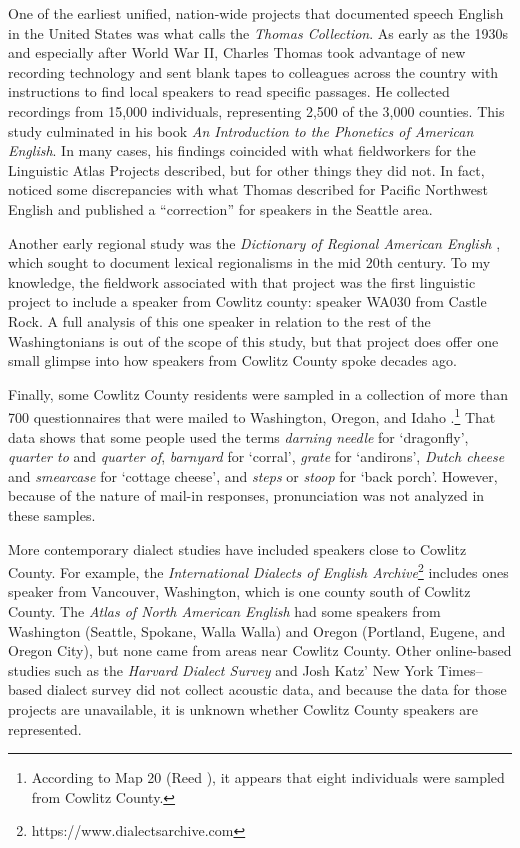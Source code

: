 One of the earliest unified, nation-wide projects that documented speech English in the United States was what \citet[216--217]{allen_1977} calls the \textit{Thomas Collection}. As early as the 1930s and especially after World War II, Charles Thomas took advantage of new recording technology and sent blank tapes to colleagues across the country with instructions to find local speakers to read specific passages. He collected recordings from 15,000 individuals, representing 2,500 of the 3,000 counties. This study culminated in his \citeyear{thomas_1958} book \textit{An Introduction to the Phonetics of American English}. In many cases, his findings coincided with what fieldworkers for the Linguistic Atlas Projects described, but for other things they did not. In fact, \citet{foster_hoffman_1966} noticed some discrepancies with what Thomas described for Pacific Northwest English and published a ``correction'' for speakers in the Seattle area.

Another early regional study was the \textit{Dictionary of Regional American English} \citep{cassidy_2013_dare}, which sought to document lexical regionalisms in the mid 20th century. To my knowledge, the fieldwork associated with that project was the first linguistic project to include a speaker from Cowlitz county: speaker WA030 from Castle Rock. A full analysis of this one speaker in relation to the rest of the Washingtonians is out of the scope of this study, but that project does offer one small glimpse into how speakers from Cowlitz County spoke decades ago.

Finally, some Cowlitz County residents were sampled in a collection of more than 700 questionnaires that were mailed to Washington, Oregon, and Idaho \citep[61,103--116]{reed_1967}.\footnote{According to Map 20 (Reed \citeyear[104]{reed_1967}), it appears that eight individuals were sampled from Cowlitz County.} That data shows that some people used the terms \textit{darning needle} for `dragonfly', \textit{quarter to} and \textit{quarter of}, \textit{barnyard} for `corral', \textit{grate} for `andirons', \textit{Dutch cheese} and \textit{smearcase} for `cottage cheese', and \textit{steps} or \textit{stoop} for `back porch'. However, because of the nature of mail-in responses, pronunciation was not analyzed in these samples.

More contemporary dialect studies have included speakers close to Cowlitz County. For example, the \textit{International Dialects of English Archive}\footnote{\scriptsize https://www.dialectsarchive.com} includes ones speaker from Vancouver, Washington, which is one county south of Cowlitz County. The \textit{Atlas of North American English} \citep{labov_ash_boberg_2006_anae} had some speakers from Washington (Seattle, Spokane, Walla Walla) and Oregon (Portland, Eugene, and Oregon City), but none came from areas near Cowlitz County. Other online-based studies such as the \textit{Harvard Dialect Survey} \citep{vaux_golder_2003} and Josh Katz' New York Times--based dialect survey \citep{katz_2016} did not collect acoustic data, and because the data for those projects are unavailable, it is unknown whether Cowlitz County speakers are represented.

